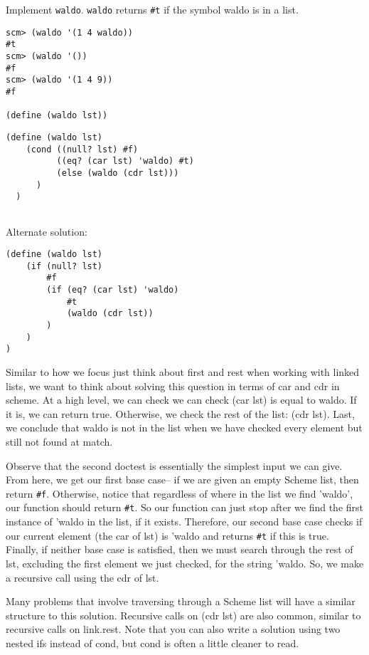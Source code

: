 \begin{blocksection}
\question Implement \texttt{waldo}. \texttt{waldo} returns \texttt{\#t} if the
symbol waldo is in a list. \\

\begin{lstlisting}
scm> (waldo '(1 4 waldo))
#t
scm> (waldo '())
#f
scm> (waldo '(1 4 9))
#f

(define (waldo lst))
\end{lstlisting}
\end{blocksection}
\begin{blocksection}
\begin{solution}[0.5in]

\begin{lstlisting}
(define (waldo lst)
    (cond ((null? lst) #f)
          ((eq? (car lst) 'waldo) #t)
          (else (waldo (cdr lst)))
      )
  )


\end{lstlisting}
Alternate solution:
\begin{lstlisting}
(define (waldo lst)
    (if (null? lst)
        #f
        (if (eq? (car lst) 'waldo)
            #t
            (waldo (cdr lst))
        )
    )
)
\end{lstlisting}
Similar to how we focus just think about  first and rest when working with linked lists, we want to think about solving this question in terms of car and cdr in scheme. At a high level, we can check we can check (car lst) is equal to waldo. If it is, we can return true. Otherwise, we check the rest of the list: (cdr lst). Last, we conclude that waldo is not in the list when we have checked every element but still not found at match.

Observe that the second doctest is essentially the simplest input we can give. From here, we get our first base case-- if we are given an empty Scheme list, then return \texttt{\#f}. Otherwise, notice that regardless of where in the list we find 'waldo', our function should return \texttt{\#t}. So our function can just stop after we find the first instance of 'waldo in the list, if it exists. Therefore, our second base case checks if our current element (the car of lst) is 'waldo and returns \texttt{\#t} if this is true. Finally, if neither base case is satisfied, then we must search through the rest of lst, excluding the first element we just checked, for the string 'waldo. So, we make a recursive call using the cdr of lst.

Many problems that involve traversing through a Scheme list will have a similar structure to this solution. Recursive calls on (cdr lst) are also common, similar to recursive calls on link.rest.  Note that you can also write a solution using two nested ifs instead of cond, but cond is often a little cleaner to read.


\end{solution}
\end{blocksection}

